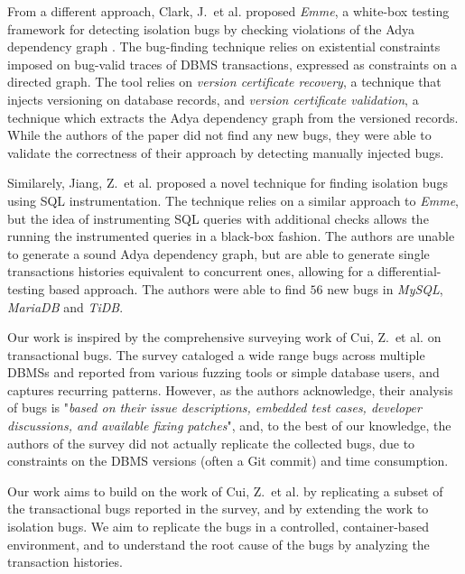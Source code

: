 From a different approach, Clark, J.\ et al. \cite{clark2024validating} proposed \textit{Emme}, a white-box testing framework for detecting isolation bugs by checking violations of the Adya dependency graph \cite{adya1999weak}. The bug-finding technique relies on existential constraints imposed on bug-valid traces of DBMS transactions, expressed as constraints on a directed graph. The tool relies on \textit{version certificate recovery}, a technique that injects versioning on database records, and \textit{version certificate validation}, a technique which extracts the Adya dependency graph from the versioned records. While the authors of the paper did not find any new bugs, they were able to validate the correctness of their approach by detecting manually injected bugs.

Similarely, Jiang, Z.\ et al. \cite{jiang2023detecting} proposed a novel technique for finding isolation bugs using SQL instrumentation. The technique relies on a similar approach to \textit{Emme}, but the idea of instrumenting SQL queries with additional checks allows the running the instrumented queries in a black-box fashion. The authors are unable to generate a sound Adya dependency graph, but are able to generate single transactions histories equivalent to concurrent ones, allowing for a differential-testing based approach. The authors were able to find $56$ new bugs in \textit{MySQL}, \textit{MariaDB} and \textit{TiDB}.

Our work is inspired by the comprehensive surveying work of Cui, Z.\ et al. \cite{cui2024understanding_ICSE2024} on transactional bugs. The survey cataloged a wide range bugs across multiple DBMSs and reported from various fuzzing tools or simple database users, and captures recurring patterns. However, as the authors acknowledge, their analysis of bugs is "\textit{based on their issue descriptions, embedded test cases, developer discussions, and available fixing patches}", and, to the best of our knowledge, the authors of the survey did not actually replicate the collected bugs, due to constraints on the DBMS versions (often a Git commit) and time consumption.

Our work aims to build on the work of Cui, Z.\ et al. \cite{cui2024understanding_ICSE2024} by replicating a subset of the transactional bugs reported in the survey, and by extending the work to isolation bugs. We aim to replicate the bugs in a controlled, container-based environment, and to understand the root cause of the bugs by analyzing the transaction histories.

